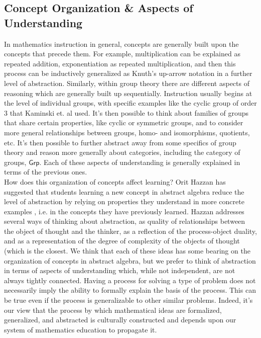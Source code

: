 \documentclass[11pt]{article}
\begin{document}
\subsection{Concept Organization \& Aspects of Understanding} %
In mathematics instruction in general, concepts are generally built upon the concepts that precede them. For example, multiplication can be explained as repeated addition, exponentiation as repeated multiplication, and then this process can be inductively generalized as Knuth's up-arrow notation in a further level of abstraction. Similarly, within group theory there are different aspects of reasoning which are generally built up sequentially. Instruction usually begins at the level of individual groups, with specific examples like the cyclic group of order 3 that Kaminski et. al used. It's then possible to think about families of groups that share certain properties, like cyclic or symmetric groups, and to consider more general relationships between groups, homo- and isomorphisms, quotients, etc. It's then possible to further abstract away from some specifics of group theory and reason more generally about categories, including the category of groups, $\mathsf{Grp}$. Each of these aspects of understanding is generally explained in terms of the previous ones.\\[11pt]
How does this organization of concepts affect learning? Orit Hazzan has suggested that students learning a new concept in abstract algebra reduce the level of abstraction by relying on properties they understand in more concrete examples \cite{Hazzan1999}, i.e. in the concepts they have previously learned. Hazzan addresses several ways of thinking about abstraction, as quality of relationships between the object of thought and the thinker, as a reflection of the process-object duality, and as a representation of the degree of complexity of the objects of thought (which is the closest. We think that each of these ideas has some bearing on the organization of concepts in abstract algebra, but we prefer to think of abstraction in terms of aspects of understanding which, while not independent, are not always tightly connected. Having a process for solving a type of problem does not necessarily imply the ability to formally explain the basis of the process. This can be true even if the process is generalizable to other similar problems. Indeed, it's our view that the process by which mathematical ideas are formalized, generalized, and abstracted is culturally constructed and depends upon our system of mathematics education to propagate it. \\[11pt]
\end{document}
